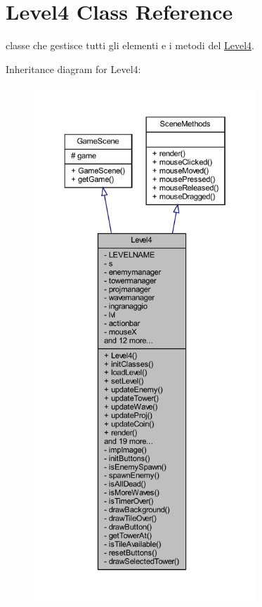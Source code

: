 \hypertarget{classscenes_1_1_level4}{}\section{Level4 Class Reference}
\label{classscenes_1_1_level4}


classe che gestisce tutti gli elementi e i metodi del \hyperlink{classscenes_1_1_level4}{Level4}.  




Inheritance diagram for Level4\+:\nopagebreak
\begin{figure}[H]
\begin{center}
\leavevmode
\includegraphics[height=550pt]{classscenes_1_1_level4__inherit__graph}
\end{center}
\end{figure}


